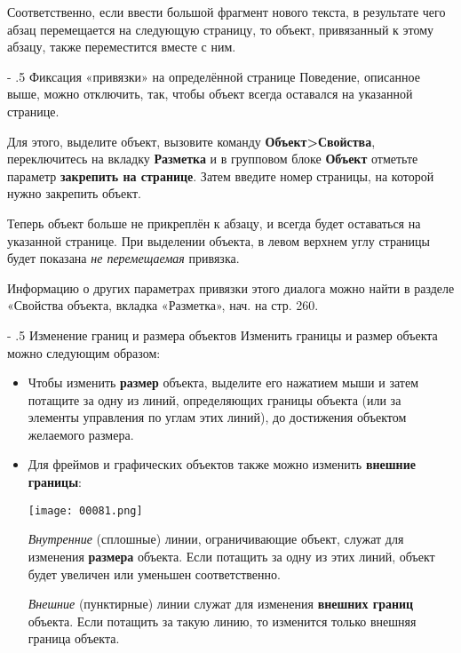 \documentclass[a4paper,10pt]{article}
\makeatletter
\renewcommand\paragraph{%
   \@startsection{paragraph}{4}{0mm}%
      {-\baselineskip}%
      {.5\baselineskip}%
      {\normalfont\normalsize\bfseries}}
\makeatother
\begin{document}
Соответственно, если ввести большой фрагмент нового текста, в результате чего абзац перемещается на следующую страницу, то объект, привязанный к этому абзацу, также переместится вместе с ним.

\paragraph{Фиксация «привязки» на определённой странице}
Поведение, описанное выше, можно отключить, так, чтобы объект всегда оставался на указанной странице.

Для этого, выделите объект, вызовите команду \textbf{Объект>Свойства}, переключитесь на вкладку \textbf{Разметка} и в групповом блоке \textbf{Объект} отметьте параметр \textbf{закрепить на странице}. Затем введите номер страницы, на которой  нужно закрепить объект.

Теперь объект больше не прикреплён к абзацу, и всегда будет оставаться на указанной странице. При выделении объекта, в левом верхнем углу страницы будет показана \textit{не перемещаемая} привязка.

Информацию о других параметрах привязки этого диалога можно  найти в разделе «Свойства объекта, вкладка «Разметка», нач. на стр. 260.

\paragraph{Изменение границ и размера объектов}
Изменить границы и размер объекта можно следующим образом:
\begin{itemize}
 \item Чтобы изменить \textbf{размер} объекта, выделите его нажатием мыши и затем потащите за одну из линий, определяющих границы объекта (или за элементы управления по углам этих линий), до достижения объектом желаемого размера.
 \item Для фреймов и графических объектов также можно изменить \textbf{внешние границы}:
 
 \texttt{[image: 00081.png]}
 
 \textit{Внутренние} (сплошные) линии, ограничивающие объект, служат для изменения \textbf{размера} объекта. Если потащить за одну из этих линий, объект будет увеличен или уменьшен соответственно.
 
 \textit{Внешние} (пунктирные) линии служат для изменения \textbf{внешних границ} объекта. Если потащить за такую линию, то изменится только внешняя граница объекта.
\end{itemize}
\end{document}
